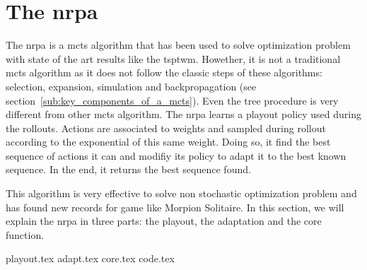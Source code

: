 \section{The \acrlong{nrpa}}%
\label{sec:the_nrpa}

The \gls{nrpa}\cite{nrpa} is a \gls{mcts} algorithm that has been used to solve optimization problem with state of the art results like the \gls{tsptwm}\cite{nrpa_tsptw}.
Howether, it is not a traditional \gls{mcts} algorithm as it does not follow the classic steps of these algorithms: selection, expansion, simulation and backpropagation (see section~\ref{sub:key_components_of_a_mcts}).
Even the tree procedure is very different from other \gls{mcts} algorithm.
The \gls{nrpa} learns a playout policy used during the rollouts.
Actions are associated to weights and sampled during rollout according to the exponential of this same weight.
Doing so, it find the best sequence of actions it can and modifiy its policy to adapt it to the best known sequence.
In the end, it returns the best sequence found.

This algorithm is very effective to solve non stochastic optimization problem and has found new records for game like Morpion Solitaire.
In this section, we will explain the \gls{nrpa} in three parts: the playout, the adaptation and the core function.

{playout.tex}
{adapt.tex}
{core.tex}
{code.tex}




